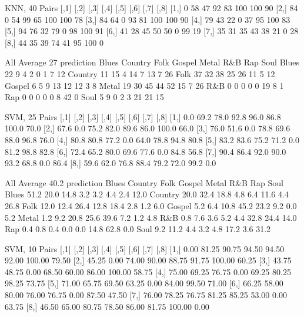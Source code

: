 \documentclass[a4paper,oneside]{article}
\begin{document}
KNN, 40
Pairs
     [,1] [,2] [,3] [,4] [,5] [,6] [,7] [,8]
[1,]    0   58   47   92   83  100  100   90
[2,]   84    0   54   99   65  100  100   78
[3,]   84   64    0   93   81  100  100   90
[4,]   79   43   22    0   37   95  100   83
[5,]   94   76   32   79    0   98  100   91
[6,]   41   28   45   50   50    0   99   19
[7,]   35   31   35   43   38   21    0   28
[8,]   44   35   39   74   41   95  100    0

All
Average 27
prediction Blues Country Folk Gospel Metal R\&B Rap Soul
   Blues      22       9    4      2     0   1   7   12
   Country    11      15    4     14     7  13   7   26
   Folk       37      32   38     25    26  11   5   12
   Gospel      6       5    9     13    12  12   3    8
   Metal      19      30   45     44    52  15   7   26
   R\&B         0       0    0      0     0  19   8    1
   Rap         0       0    0      0     0   8  42    0
   Soul        5       9    0      2     3  21  21   15


SVM, 25
Pairs
     [,1] [,2] [,3] [,4] [,5] [,6]  [,7] [,8]
[1,]  0.0 69.2 78.0 92.8 96.0 86.8 100.0 70.0
[2,] 67.6  0.0 75.2 82.0 89.6 86.0 100.0 66.0
[3,] 76.0 51.6  0.0 78.8 69.6 88.0  96.8 76.0
[4,] 80.8 80.8 77.2  0.0 64.0 78.8  94.8 80.8
[5,] 83.2 83.6 75.2 71.2  0.0 81.2  98.8 82.8
[6,] 72.4 65.2 80.0 69.6 77.6  0.0  84.8 56.8
[7,] 90.4 86.4 92.0 90.0 93.2 68.8   0.0 86.4
[8,] 59.6 62.0 76.8 88.4 79.2 72.0  99.2  0.0

All
Average 40.2
prediction Blues Country Folk Gospel Metal  R\&B  Rap Soul
   Blues    51.2    20.0 14.8    3.2   3.2  4.4  2.4 12.0
   Country  20.0    32.4 18.8    4.8   6.4 11.6  4.4 26.8
   Folk     12.0    12.4 26.4   12.8  18.4  2.8  1.2  6.0
   Gospel    5.2     6.4 10.8   45.2  23.2  9.2  0.0  5.2
   Metal     1.2     9.2 20.8   25.6  39.6  7.2  1.2  4.8
   R\&B       0.8     7.6  3.6    5.2   4.4 32.8 24.4 14.0
   Rap       0.4     0.8  0.4    0.0   0.0 14.8 62.8  0.0
   Soul      9.2    11.2  4.4    3.2   4.8 17.2  3.6 31.2

SVM, 10
Pairs
      [,1]  [,2]  [,3]  [,4]  [,5]  [,6]   [,7]  [,8]
[1,]  0.00 81.25 90.75 94.50 94.50 92.00 100.00 79.50
[2,] 45.25  0.00 74.00 90.00 88.75 91.75 100.00 60.25
[3,] 43.75 48.75  0.00 68.50 60.00 86.00 100.00 58.75
[4,] 75.00 69.25 76.75  0.00 69.25 80.25  98.25 73.75
[5,] 71.00 65.75 69.50 63.25  0.00 84.00  99.50 71.00
[6,] 66.25 58.00 80.00 76.00 76.75  0.00  87.50 47.50
[7,] 76.00 78.25 76.75 81.25 85.25 53.00   0.00 63.75
[8,] 46.50 65.00 80.75 78.50 86.00 81.75 100.00  0.00
\end{document}
